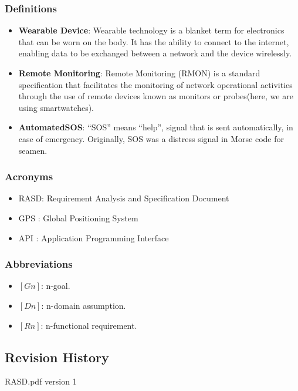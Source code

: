\documentclass[12pt]{article}
\begin{document}
\subsubsection{Definitions}
\begin{itemize}
\item{} \textbf{Wearable Device}: Wearable technology is a blanket term for electronics that can be worn on the body. It has the ability to connect to the internet, enabling data to be exchanged between a network and the device wirelessly.

\item{} \textbf{Remote Monitoring}: Remote Monitoring (RMON) is a standard specification that facilitates the monitoring of network operational activities through the use of remote devices known as monitors or probes(here, we are using smartwatches).

\item{} \textbf{AutomatedSOS}: “SOS” means “help”, signal that is sent automatically, in case of emergency. Originally, SOS was a distress signal in Morse code for seamen.

\end{itemize}
\subsubsection{Acronyms}
\begin{itemize}
\item{} RASD: Requirement Analysis and Specification Document
\item{} GPS : Global Positioning System
\item{} API : Application Programming Interface

\end{itemize}

\subsubsection{Abbreviations}
\begin{itemize}
\item $[Gn]$: n-goal. 
\item $[Dn]$: n-domain assumption. 
\item $[Rn]$: n-functional requirement. 

\end{itemize}
\subsection{Revision History}
RASD.pdf version 1
\end{document}
